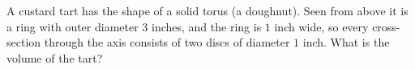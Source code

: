 A custard tart has the shape of a solid torus (a doughnut). Seen from above it is a ring with outer diameter $3$ inches, and the ring is $1$ inch wide, so every cross-section through the axis consists of two discs of diameter $1$ inch. What is the volume of the tart?
